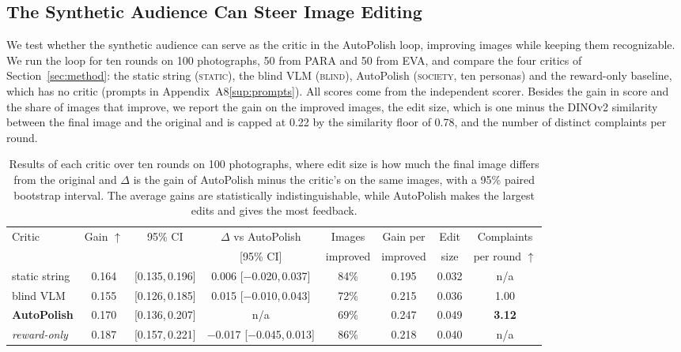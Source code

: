 \documentclass[runningheads]{llncs}
\newcommand{\appref}[2]{\ifdefined\mainonly #2\else\ref{#1}\fi}
\begin{document}
\subsection{The Synthetic Audience Can Steer Image Editing}
\label{sec:c4}

We test whether the synthetic audience can serve as the critic in the AutoPolish loop, improving images while keeping them recognizable. We run the loop for ten rounds on 100 photographs, 50 from PARA and 50 from EVA, and compare the four critics of Section~\ref{sec:method}: the static string (\textsc{static}), the blind VLM (\textsc{blind}), AutoPolish (\textsc{society}, ten personas) and the reward-only baseline, which has no critic (prompts in Appendix~\appref{sup:prompts}{A8}). All scores come from the independent scorer. Besides the gain in score and the share of images that improve, we report the gain on the improved images, the edit size, which is one minus the DINOv2 similarity between the final image and the original and is capped at 0.22 by the similarity floor of 0.78, and the number of distinct complaints per round.

\begin{table}[b]
  \caption{Results of each critic over ten rounds on 100 photographs, where edit size is how much the final image differs from the original and $\Delta$ is the gain of AutoPolish minus the critic's on the same images, with a 95\% paired bootstrap interval. The average gains are statistically indistinguishable, while AutoPolish makes the largest edits and gives the most feedback.}
  \label{tab:c4}
  \centering
  \fontsize{7.5}{9}\selectfont
  \setlength{\aboverulesep}{0pt}\setlength{\belowrulesep}{0pt}
  \renewcommand{\arraystretch}{1.1}
  \setlength{\tabcolsep}{2pt}
  \begin{tabular*}{\linewidth}{@{\extracolsep{\fill}}l|ccccccc@{}}
    \toprule
    \multirow{2}{*}{Critic} & \multirow{2}{*}{Gain $\uparrow$} & \multirow{2}{*}{95\% CI} & $\Delta$ vs AutoPolish\rule{0pt}{2.4ex} & Images & Gain per & Edit & Complaints \\
    \rule[-0.8ex]{0pt}{0pt} & & & [95\% CI] & improved & improved & size & per round $\uparrow$ \\
    \midrule
    static string\rule{0pt}{2.3ex} & 0.164 & [0.135,\,0.196] & 0.006 [$-$0.020,\,0.037] & 84\% & 0.195 & 0.032 & n/a \\
    blind VLM            & 0.155 & [0.126,\,0.185] & 0.015 [$-$0.010,\,0.043] & 72\% & 0.215 & 0.036 & 1.00 \\
    \textbf{AutoPolish}\rule[-0.7ex]{0pt}{0pt} & 0.170 & [0.136,\,0.207] & n/a & 69\% & 0.247 & 0.049 & \textbf{3.12} \\
    \midrule
    \textit{reward-only}\rule{0pt}{2.3ex}\rule[-0.7ex]{0pt}{0pt} & 0.187 & [0.157,\,0.221] & $-$0.017 [$-$0.045,\,0.013] & 86\% & 0.218 & 0.040 & n/a \\
    \bottomrule
  \end{tabular*}
\end{table}
\end{document}
